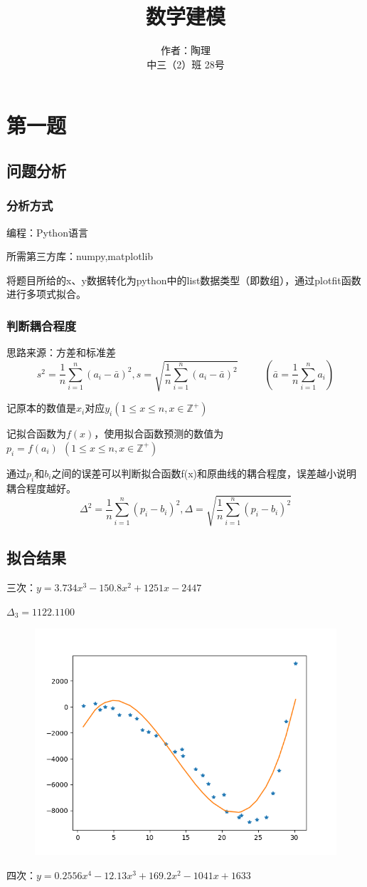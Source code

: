 \documentclass[lang=cn,a4paper]{elegantpaper}
\title{数学建模}
\author{作者：陶理 \\ 中三（2）班  28号}
\institute{上海市实验学校}
\date{\zhtoday}
\begin{document}
    \maketitle

    \section{第一题}
    \subsection{问题分析}
    \subsubsection*{分析方式}
    编程：Python语言

    所需第三方库：numpy,matplotlib
    
    将题目所给的x、y数据转化为python中的list数据类型（即数组），通过plotfit函数进行多项式拟合。
    \subsubsection*{判断耦合程度}
    思路来源：方差和标准差
    $$
    s^2=\frac{1}{n}\sum_{i=1}^n (a_i-\bar{a})^2,s=\sqrt{\frac{1}{n}\sum_{i=1}^n (a_i-\bar{a})^2}~~~~~~~~~~~~(\bar{a}=\frac{1}{n}\sum_{i=1}^n a_i)
    $$

    记原本的数值是$x_i$对应$y_i(1\leqslant x\leqslant n,x\in \mathbb{Z}^+)$

    记拟合函数为$f(x)$，使用拟合函数预测的数值为$p_i=f(a_i)~~(1\leqslant x\leqslant n,x\in \mathbb{Z}^+)$
    
    通过$p_i$和$b_i$之间的误差可以判断拟合函数f(x)和原曲线的耦合程度，误差越小说明耦合程度越好。
    $$
    \Delta^2=\frac{1}{n}\sum_{i=1}^n (p_i-b_i)^2, \Delta=\sqrt{\frac{1}{n}\sum_{i=1}^n (p_i-b_i)^2}
    $$
    \subsection{拟合结果}
    三次：$y=3.734x^3-150.8x^2+1251x-2447$

    $\Delta_3=1122.1100$
    \begin{figure}[H]
        \includegraphics[scale=0.4]{1-3.png}
    \end{figure}
    四次：$y=0.2556x^4-12.13x^3+169.2x^2-1041x+1633$
\end{document}
